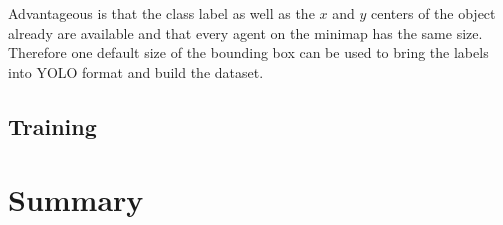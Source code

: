 Advantageous is that the class label as well as the $x$ and $y$ centers of the object already are 
available and that every agent on the minimap has the same size. Therefore one default size of the 
bounding box can be used to bring the labels into YOLO format and build the dataset.

\subsection{Training}\label{subsec:app:training}

\section{Summary}\label{sec:app:summary}
